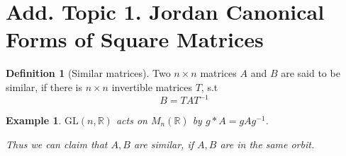 \documentclass{article}
\theoremstyle{MyNonumberplain}
\theoremstyle{break}
\newcommand{\tmop}{\text}
\theoremstyle{break}
\newtheorem{example}{Example}[section]
\theoremstyle{break}
\theoremstyle{definition}
\theoremstyle{break}
\newtheorem{definition}{Definition}[section]
\begin{document}
\newpage

\section*{Add. Topic 1. Jordan Canonical Forms of Square Matrices}
\begin{defbox}
    \begin{definition}[Similar matrices]
        Two $n \times n$ matrices $A$ and $B$ are said to be similar, if there is $n
        \times n$ invertible matrices $T$, s.t
        \[ B = T A T^{- 1} \]
    \end{definition}
\end{defbox}

\begin{expbox}
    \begin{example}
        $\tmop{GL} (n, \mathbb{R})$ acts on $M_n (\mathbb{R})$ by $g \ast A = g A g^{-
        1}$.
        
        Thus we can claim that $A, B$ are similar, if $A, B$ are in the same orbit.
    \end{example}
\end{expbox}
\end{document}
